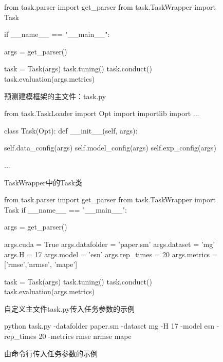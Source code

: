 
\begin{figure}[t!]
    \begin{minipage}[b]{0.45\textwidth}
        \begin{python}
            from task.parser import get_parser
            from task.TaskWrapper import Task

            if __name__ == "__main__":
                
                args = get_parser()
        
                task = Task(args)
                task.tuning()
                task.conduct()
                task.evaluation(args.metrics)
            
            \end{python}
        \caption{预测建模框架的主文件：task.py \label{fig:ch.univ.task}}
    \end{minipage}
    \hfill
    \begin{minipage}[b]{0.45\textwidth}
        \begin{python}
            from task.TaskLoader import Opt
            import importlib
            import ...

            class Task(Opt):
                def __init__(self, args):
                    
                    self.data_config(args)
                    self.model_config(args)
                    self.exp_config(args)

                ...
            \end{python}
        \caption{TaskWrapper中的Task类 \label{fig:ch.univ.init}}
    \end{minipage}
\end{figure}

\begin{figure}[t!]
    \begin{python}
        from task.parser import get_parser
        from task.TaskWrapper import Task
        if __name__ == "__main__":
            
            args = get_parser()
        
            args.cuda = True
            args.datafolder = 'paper.sm'
            args.dataset = 'mg'
            args.H = 17
            args.model = 'esn'
            args.rep_times = 20
            args.metrics = ['rmse','nrmse', 'mape']
            
            task = Task(args)
            task.tuning()
            task.conduct()
            task.evaluation(args.metrics)
        
        \end{python}
        \caption{自定义主文件task.py传入任务参数的示例\label{fig:ch.univ.mg} }
    \end{figure}

    \begin{figure}[t!]
        \begin{bash}
            python task.py -datafolder paper.sm -dataset mg -H 17 -model esn -rep_times 20 -metrics rmse nrmse mape
        \end{bash}
            \caption{由命令行传入任务参数的示例\label{fig:ch.univ.bash} }
        \end{figure}